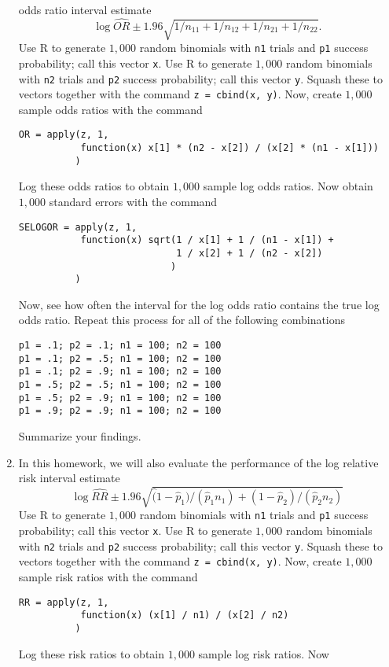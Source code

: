 \documentclass[12pt]{article}
\begin{document}
\begin{enumerate}[Problem 1.]
  odds ratio interval estimate
  $$
  \log \hat{OR} \pm 1.96 \sqrt{1/n_{11} + 1/n_{12} + 1 / n_{21} + 1 / n_{22}}.
  $$
  Use R to generate $1,000$ random binomials with \texttt{n1} trials
  and \texttt{p1} success probability; call this vector \texttt{x}.
  Use R to generate $1,000$ random binomials with \texttt{n2} trials
  and \texttt{p2} success probability; call this vector \texttt{y}.
  Squash these to vectors together with the command \texttt{z =
    cbind(x, y)}. Now, create $1,000$ sample odds ratios with the
  command
\begin{verbatim}
OR = apply(z, 1, 
           function(x) x[1] * (n2 - x[2]) / (x[2] * (n1 - x[1]))
          )
\end{verbatim}
  Log these odds ratios to obtain $1,000$ sample log odds ratios. Now
  obtain $1,000$ standard errors with the command
\begin{verbatim}
SELOGOR = apply(z, 1, 
           function(x) sqrt(1 / x[1] + 1 / (n1 - x[1]) + 
                            1 / x[2] + 1 / (n2 - x[2])
                           )
          )
\end{verbatim}
  Now, see how often the interval for the log odds ratio contains the
  true log odds ratio.  Repeat this process for all of the following
  combinations
\begin{verbatim}
p1 = .1; p2 = .1; n1 = 100; n2 = 100
p1 = .1; p2 = .5; n1 = 100; n2 = 100
p1 = .1; p2 = .9; n1 = 100; n2 = 100
p1 = .5; p2 = .5; n1 = 100; n2 = 100
p1 = .5; p2 = .9; n1 = 100; n2 = 100
p1 = .9; p2 = .9; n1 = 100; n2 = 100
\end{verbatim}
  Summarize your findings. 
\item In this homework, we will also evaluate the performance of the log
  relative risk interval estimate
  $$
  \log \hat{RR} \pm 1.96 \sqrt{\hat (1 - \hat p_1) / (\hat p_1 n_1) + (1 - \hat p_2) / (\hat p_2 n_2)} 
  $$
  Use R to generate $1,000$ random binomials with \texttt{n1} trials
  and \texttt{p1} success probability; call this vector \texttt{x}.
  Use R to generate $1,000$ random binomials with \texttt{n2} trials
  and \texttt{p2} success probability; call this vector \texttt{y}.
  Squash these to vectors together with the command \texttt{z =
    cbind(x, y)}.  Now, create $1,000$ sample risk ratios with the
  command
\begin{verbatim}
RR = apply(z, 1, 
           function(x) (x[1] / n1) / (x[2] / n2)
          )
\end{verbatim}
  Log these risk ratios to obtain $1,000$ sample log risk ratios. Now

\end{enumerate}
\end{document}
